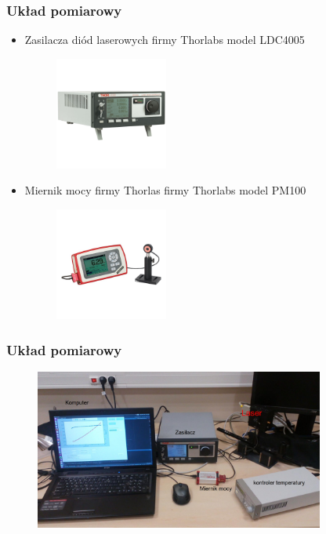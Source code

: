 \documentclass[xcolor={dvipsnames,table}]{beamer}
\begin{document}
\begin{frame}
\frametitle{Układ pomiarowy}
\begin{itemize}
\item Zasilacza diód laserowych firmy Thorlabs model LDC4005 
\begin{figure}
   \includegraphics[width=0.35\textwidth,natwidth=69,natheight=87]{ldc4005.jpg}
\end{figure}
\item Miernik mocy firmy Thorlas firmy Thorlabs model PM100
\begin{figure}
   \includegraphics[width=0.35\textwidth,natwidth=69,natheight=87]{pm100.jpg}
\end{figure}
\end{itemize}
\end{frame}

\begin{frame}
\frametitle{Układ pomiarowy}
\begin{figure}
   \includegraphics[width=0.85\textwidth,natwidth=69,natheight=87]{uklad.jpg}
\end{figure}
\end{frame}
\end{document}
